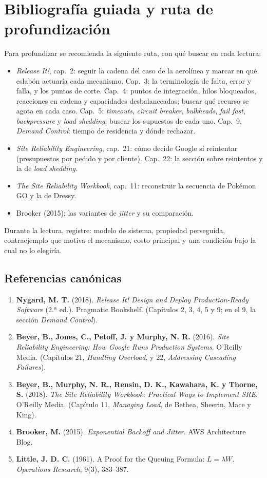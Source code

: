 \documentclass[variant=apuntes,cover=institutional,mode=screen]{ua-engineering-v6-article}
\begin{document}
\section{Bibliografía guiada y ruta de profundización}

Para profundizar se recomienda la siguiente ruta, con qué buscar en cada lectura:
\begin{itemize}
\item \emph{Release It!}, cap.~2: seguir la cadena del caso de la aerolínea y marcar en qué eslabón actuaría cada mecanismo. Cap.~3: la terminología de falta, error y falla, y los puntos de corte. Cap.~4: puntos de integración, hilos bloqueados, reacciones en cadena y capacidades desbalanceadas; buscar qué recurso se agota en cada caso. Cap.~5: \emph{timeouts}, \emph{circuit breaker}, \emph{bulkheads}, \emph{fail fast}, \emph{backpressure} y \emph{load shedding}; buscar los supuestos de cada uno. Cap.~9, \emph{Demand Control}: tiempo de residencia y dónde rechazar.
\item \emph{Site Reliability Engineering}, cap.~21: cómo decide Google si reintentar (presupuestos por pedido y por cliente). Cap.~22: la sección sobre reintentos y la de \emph{load shedding}.
\item \emph{The Site Reliability Workbook}, cap.~11: reconstruir la secuencia de Pokémon GO y la de Dressy.
\item Brooker (2015): las variantes de \emph{jitter} y su comparación.
\end{itemize}

Durante la lectura, registre: modelo de sistema, propiedad perseguida, contraejemplo que motiva el mecanismo, costo principal y una condición bajo la cual no lo elegiría.

\subsection*{Referencias canónicas}
\begin{enumerate}
\item \textbf{Nygard, M. T.} (2018). \emph{Release It! Design and Deploy Production-Ready Software} (2.ª ed.). Pragmatic Bookshelf. (Capítulos 2, 3, 4, 5 y 9; en el 9, la sección \emph{Demand Control}).
\item \textbf{Beyer, B., Jones, C., Petoff, J. y Murphy, N. R.} (2016). \emph{Site Reliability Engineering: How Google Runs Production Systems}. O'Reilly Media. (Capítulos 21, \emph{Handling Overload}, y 22, \emph{Addressing Cascading Failures}).
\item \textbf{Beyer, B., Murphy, N. R., Rensin, D. K., Kawahara, K. y Thorne, S.} (2018). \emph{The Site Reliability Workbook: Practical Ways to Implement SRE}. O'Reilly Media. (Capítulo 11, \emph{Managing Load}, de Bethea, Sheerin, Mace y King).
\item \textbf{Brooker, M.} (2015). \emph{Exponential Backoff and Jitter}. AWS Architecture Blog.
\item \textbf{Little, J. D. C.} (1961). A Proof for the Queuing Formula: $L = \lambda W$. \emph{Operations Research}, 9(3), 383--387.
\end{enumerate}
\end{document}
